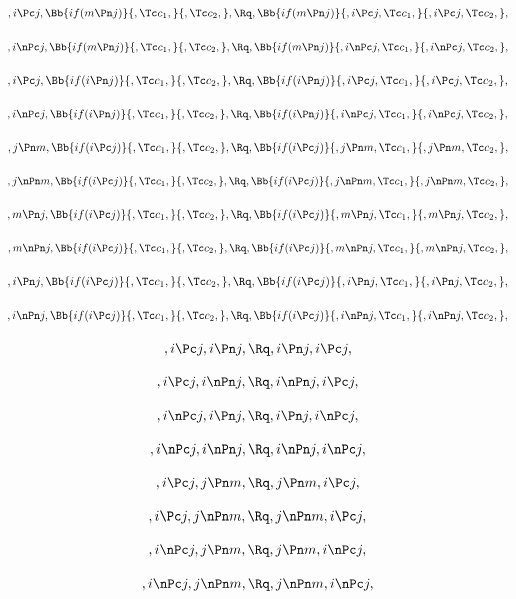 \bigskip
\bigskip
\[, i \Pc j,\Bb{if(m \Pn j)}{,\Tc c_1,}{,\Tc c_2,}, \Rq , \Bb{if(m \Pn j)}{,i \Pc j, \Tc c_1,}{,i \Pc j, \Tc c_2,},\]

\bigskip
\bigskip
\[, i \nPc j,\Bb{if(m \Pn j)}{,\Tc c_1,}{,\Tc c_2,}, \Rq , \Bb{if(m \Pn j)}{,i \nPc j, \Tc c_1,}{,i \nPc j, \Tc c_2,},\]


\bigskip
\bigskip
\[, i \Pc j,\Bb{if(i \Pn j)}{,\Tc c_1,}{,\Tc c_2,}, \Rq , \Bb{if(i \Pn j)}{,i \Pc j, \Tc c_1,}{,i \Pc j, \Tc c_2,},\]

\bigskip
\bigskip
\[, i \nPc j,\Bb{if(i \Pn j)}{,\Tc c_1,}{,\Tc c_2,}, \Rq , \Bb{if(i \Pn j)}{,i \nPc j, \Tc c_1,}{,i \nPc j, \Tc c_2,},\]

\bigskip
\bigskip
\[, j \Pn m,\Bb{if(i \Pc j)}{,\Tc c_1,}{,\Tc c_2,}, \Rq , \Bb{if(i \Pc j)}{,j \Pn m, \Tc c_1,}{,j \Pn m, \Tc c_2,},\]

\bigskip
\bigskip
\[, j \nPn m,\Bb{if(i \Pc j)}{,\Tc c_1,}{,\Tc c_2,}, \Rq , \Bb{if(i \Pc j)}{,j \nPn m, \Tc c_1,}{,j \nPn m, \Tc c_2,},\]

\bigskip
\bigskip
\[, m \Pn j,\Bb{if(i \Pc j)}{,\Tc c_1,}{,\Tc c_2,}, \Rq , \Bb{if(i \Pc j)}{,m \Pn j, \Tc c_1,}{,m \Pn j, \Tc c_2,},\]

\bigskip
\bigskip
\[, m \nPn j,\Bb{if(i \Pc j)}{,\Tc c_1,}{,\Tc c_2,}, \Rq , \Bb{if(i \Pc j)}{,m \nPn j, \Tc c_1,}{,m \nPn j, \Tc c_2,},\]

\bigskip
\bigskip
\[, i \Pn j,\Bb{if(i \Pc j)}{,\Tc c_1,}{,\Tc c_2,}, \Rq , \Bb{if(i \Pc j)}{,i \Pn j, \Tc c_1,}{,i \Pn j, \Tc c_2,},\]

\bigskip
\bigskip
\[, i \nPn j,\Bb{if(i \Pc j)}{,\Tc c_1,}{,\Tc c_2,}, \Rq , \Bb{if(i \Pc j)}{,i \nPn j, \Tc c_1,}{,i \nPn j, \Tc c_2,},\]

\bigskip
\bigskip


\[,i \Pc j, i \Pn j, \Rq , i \Pn j, i \Pc j,\]

\[,i \Pc j, i \nPn j, \Rq , i \nPn j, i \Pc j,\]

\[,i \nPc j, i \Pn j, \Rq , i \Pn j, i \nPc j,\]

\[,i \nPc j, i \nPn j, \Rq , i \nPn j, i \nPc j,\]

\[,i \Pc j, j \Pn m, \Rq , j \Pn m, i \Pc j,\]

\[,i \Pc j, j \nPn m, \Rq , j \nPn m, i \Pc j,\]

\[,i \nPc j, j \Pn m, \Rq , j \Pn m, i \nPc j,\]

\[,i \nPc j, j \nPn m, \Rq , j \nPn m, i \nPc j,\]



